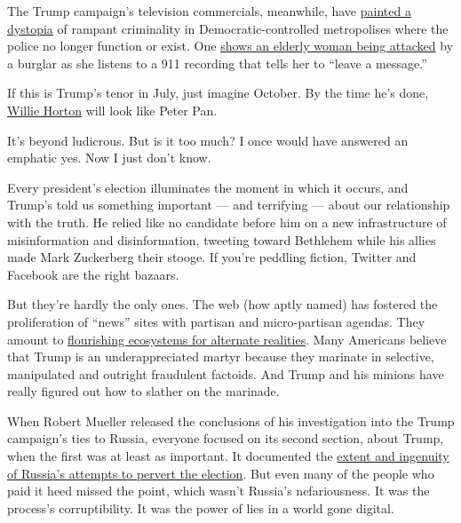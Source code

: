 The Trump campaign's television commercials, meanwhile, have
\href{https://www.nytimes.com/2020/07/21/us/politics/trump-portland-federal-agents.html}{painted
a dystopia} of rampant criminality in Democratic-controlled metropolises
where the police no longer function or exist. One
\href{https://www.nytimes.com/2020/07/21/us/politics/trump-portland-federal-agents.html}{shows
an elderly woman being attacked} by a burglar as she listens to a 911
recording that tells her to ``leave a message.''

If this is Trump's tenor in July, just imagine October. By the time he's
done,
\href{https://www.cnn.com/2018/11/01/politics/willie-horton-ad-1988-explainer-trnd/index.html}{Willie
Horton} will look like Peter Pan.

It's beyond ludicrous. But is it too much? I once would have answered an
emphatic yes. Now I just don't know.

Every president's election illuminates the moment in which it occurs,
and Trump's told us something important --- and terrifying --- about our
relationship with the truth. He relied like no candidate before him on a
new infrastructure of misinformation and disinformation, tweeting toward
Bethlehem while his allies made Mark Zuckerberg their stooge. If you're
peddling fiction, Twitter and Facebook are the right bazaars.

But they're hardly the only ones. The web (how aptly named) has fostered
the proliferation of ``news'' sites with partisan and micro-partisan
agendas. They amount to
\href{https://www.nytimes.com/2018/10/30/opinion/internet-violence-hate-prejudice.html}{flourishing
ecosystems for alternate realities}. Many Americans believe that Trump
is an underappreciated martyr because they marinate in selective,
manipulated and outright fraudulent factoids. And Trump and his minions
have really figured out how to slather on the marinade.

When Robert Mueller released the conclusions of his investigation into
the Trump campaign's ties to Russia, everyone focused on its second
section, about Trump, when the first was at least as important. It
documented the
\href{https://www.pbs.org/newshour/show/inside-the-mueller-report-a-sophisticated-russian-interference-campaign}{extent
and ingenuity of Russia's attempts to pervert the election}. But even
many of the people who paid it heed missed the point, which wasn't
Russia's nefariousness. It was the process's corruptibility. It was the
power of lies in a world gone digital.

